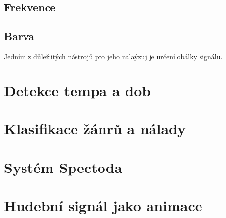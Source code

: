 
  \subsection{Frekvence} \label{sec:Frekvence}

  \subsection{Barva} \label{sec:Barva}

  Jedním z důležiitých nástrojů pro jeho nalaýzuj je určení obálky signálu.

\section{Detekce tempa a dob}
\section{Klasifikace žánrů a nálady}

\section{Systém Spectoda}

\section{Hudební signál jako animace}
